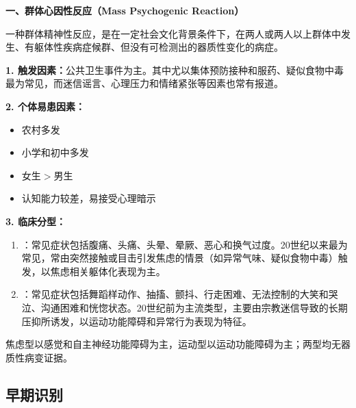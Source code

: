 \begin{keybox}
\textbf{一、群体心因性反应（Mass Psychogenic Reaction）}

一种群体精神性反应，是在一定社会文化背景条件下，在两人或两人以上群体中发生、有躯体性疾病症候群、但没有可检测出的器质性变化的病症。

\textbf{1. 触发因素：}公共卫生事件为主。其中尤以集体预防接种和服药、疑似食物中毒最为常见，而迷信谣言、心理压力和情绪紧张等因素也常有报道。

\textbf{2. 个体易患因素：}
\begin{itemize}[leftmargin=*]
    \item 农村多发
    \item 小学和初中多发
    \item 女生$>$男生
    \item 认知能力较差，易接受心理暗示
\end{itemize}

\textbf{3. 临床分型：}
\begin{enumerate}[leftmargin=*]
    \item {}：常见症状包括腹痛、头痛、头晕、晕厥、恶心和换气过度。20世纪以来最为常见，常由突然接触或目击引发焦虑的情景（如异常气味、疑似食物中毒）触发，以焦虑相关躯体化表现为主。
    \item {}：常见症状包括舞蹈样动作、抽搐、颤抖、行走困难、无法控制的大笑和哭泣、沟通困难和恍惚状态。20世纪前为主流类型，主要由宗教迷信导致的长期压抑所诱发，以运动功能障碍和异常行为表现为特征。
\end{enumerate}
焦虑型以感觉和自主神经功能障碍为主，运动型以运动功能障碍为主；两型均无器质性病变证据。
\end{keybox}

\subsection{早期识别}

